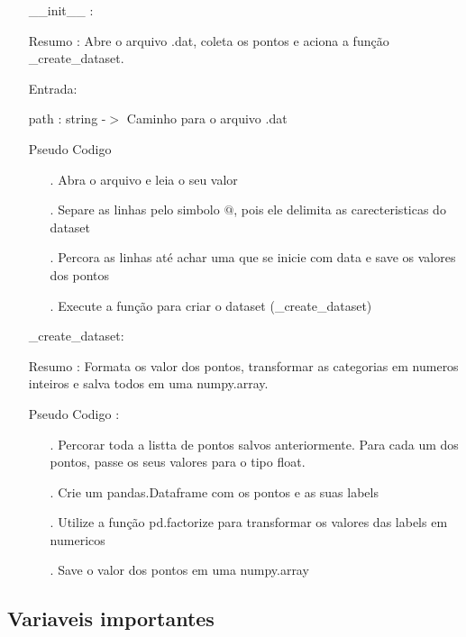 \documentclass{article}
\begin{document}
	\begin{enumerate}
	
	\item[] \_\_init\_\_ : 
	
		\quad Resumo : Abre o arquivo .dat, coleta os pontos e aciona a função \_create\_dataset.
	
		\quad Entrada: 
	
			\qquad path : string -$>$ Caminho para o arquivo .dat
	
		\quad Pseudo Codigo
		
		\begin{enumerate}
	
		\item[.] Abra o arquivo e leia o seu valor
		\item[.] Separe as linhas pelo simbolo $@$, pois ele delimita as carecteristicas do dataset
		\item[.] Percora as linhas até achar uma que se inicie com data e save os valores dos pontos
		\item[.] Execute a função para criar o dataset (\_create\_dataset)
	
		\end{enumerate}
	
	\item[] \_create\_dataset: 
	
		\quad Resumo : Formata os valor dos pontos, transformar as categorias em numeros inteiros  e salva todos em uma numpy.array.
	
		\quad Pseudo Codigo :
		
		\begin{enumerate}
	
		\item[.] Percorar toda a listta de pontos salvos anteriormente. Para cada um dos pontos, passe os seus valores para o tipo float.
		\item[.] Crie um pandas.Dataframe com os pontos e as suas labels
		\item[.] Utilize a função pd.factorize para transformar os valores das labels em numericos
		\item[.] Save o valor dos pontos em uma numpy.array
	
		\end{enumerate}
	

\end{enumerate}

\subsection{Variaveis importantes}
\end{document}
